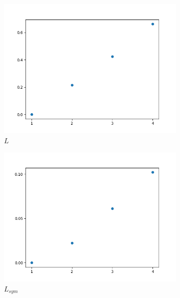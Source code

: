 \documentclass[a4paper,12pt]{article}
\theoremstyle{definition}
\theoremstyle{plain}
\begin{document}
\begin{figure}[H]
	\centering
	\captionsetup{justification=centering}
	\begin{subfigure}[b]{0.3\textwidth} %
		\centering
		\includegraphics[width=0.9\linewidth]{figures/Fig_E4_L} %
		\caption{$L$}
	\end{subfigure}
	\begin{subfigure}[b]{0.3\textwidth} %
		\centering
		\includegraphics[width=0.9\linewidth]{figures/Fig_E5_L_sym} %
		\caption{$L_{sym}$}
	\end{subfigure}
	\begin{subfigure}[b]{0.3\textwidth} %
		\centering

\end{subfigure}
\end{figure}
\end{document}
